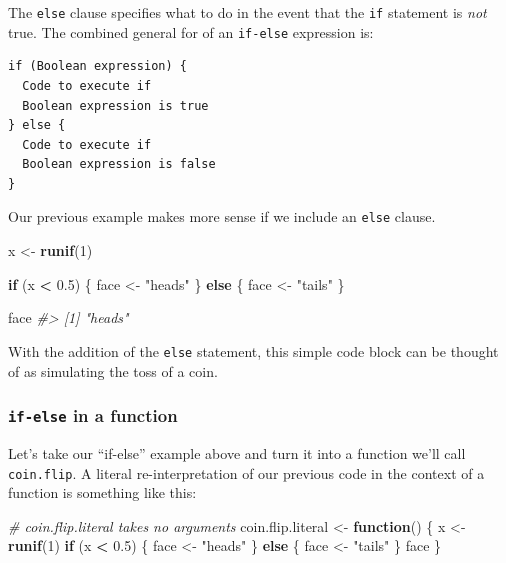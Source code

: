 \documentclass[]{book}
\newenvironment{Shaded}{\begin{snugshade}}{\end{snugshade}}
\newcommand{\CommentTok}[1]{\textcolor[rgb]{0.56,0.35,0.01}{\textit{#1}}}
\newcommand{\ControlFlowTok}[1]{\textcolor[rgb]{0.13,0.29,0.53}{\textbf{#1}}}
\newcommand{\DecValTok}[1]{\textcolor[rgb]{0.00,0.00,0.81}{#1}}
\newcommand{\FloatTok}[1]{\textcolor[rgb]{0.00,0.00,0.81}{#1}}
\newcommand{\KeywordTok}[1]{\textcolor[rgb]{0.13,0.29,0.53}{\textbf{#1}}}
\newcommand{\NormalTok}[1]{#1}
\newcommand{\OperatorTok}[1]{\textcolor[rgb]{0.81,0.36,0.00}{\textbf{#1}}}
\newcommand{\StringTok}[1]{\textcolor[rgb]{0.31,0.60,0.02}{#1}}
\theoremstyle{definition}
\theoremstyle{definition}
\theoremstyle{definition}
\theoremstyle{remark}
\begin{document}
The \texttt{else} clause specifies what to do in the event that the
\texttt{if} statement is \emph{not} true. The combined general for of an
\texttt{if-else} expression is:

\begin{verbatim}
if (Boolean expression) {
  Code to execute if 
  Boolean expression is true
} else {
  Code to execute if 
  Boolean expression is false
}
\end{verbatim}

Our previous example makes more sense if we include an \texttt{else}
clause.

\begin{Shaded}
\begin{Highlighting}[]
\NormalTok{x <-}\StringTok{ }\KeywordTok{runif}\NormalTok{(}\DecValTok{1}\NormalTok{)}

\ControlFlowTok{if}\NormalTok{ (x }\OperatorTok{<}\StringTok{ }\FloatTok{0.5}\NormalTok{) \{}
\NormalTok{  face <-}\StringTok{ "heads"}
\NormalTok{\} }\ControlFlowTok{else}\NormalTok{ \{}
\NormalTok{  face <-}\StringTok{ "tails"}
\NormalTok{\}}

\NormalTok{face}
\CommentTok{#> [1] "heads"}
\end{Highlighting}
\end{Shaded}

With the addition of the \texttt{else} statement, this simple code block
can be thought of as simulating the toss of a coin.

\hypertarget{if-else-in-a-function}{%
\subsubsection{\texorpdfstring{\texttt{if-else} in a
function}{if-else in a function}}\label{if-else-in-a-function}}

Let's take our ``if-else'' example above and turn it into a function
we'll call \texttt{coin.flip}. A literal re-interpretation of our
previous code in the context of a function is something like this:

\begin{Shaded}
\begin{Highlighting}[]
\CommentTok{# coin.flip.literal takes no arguments}
\NormalTok{coin.flip.literal <-}\StringTok{ }\ControlFlowTok{function}\NormalTok{() \{}
\NormalTok{  x <-}\StringTok{ }\KeywordTok{runif}\NormalTok{(}\DecValTok{1}\NormalTok{)}
  \ControlFlowTok{if}\NormalTok{ (x }\OperatorTok{<}\StringTok{ }\FloatTok{0.5}\NormalTok{) \{}
\NormalTok{    face <-}\StringTok{ "heads"}
\NormalTok{  \} }\ControlFlowTok{else}\NormalTok{ \{}
\NormalTok{    face <-}\StringTok{ "tails"}
\NormalTok{  \}}
\NormalTok{  face}
\NormalTok{\}}
\end{Highlighting}
\end{Shaded}
\end{document}
